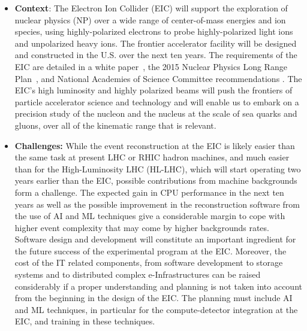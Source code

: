 \begin{itemize}
        \item \textbf{Context}:
        The Electron Ion Collider (EIC) will support the exploration of nuclear physics (NP) over a wide range of center-of-mass energies and ion species, using highly-polarized electrons to probe highly-polarized light ions and unpolarized heavy ions. The frontier accelerator facility will be designed and constructed in the U.S. over the next ten years. The requirements of the EIC are detailed in a white paper~\cite{Accardi:2012qut}, the 2015 Nuclear Physics Long Range Plan~\cite{Geesaman:2015fha}, and National Academies of Science Committee recommendations \cite{NAS:2018eic}. The EIC’s high luminosity and highly polarized beams will push the frontiers of particle accelerator science and technology and will enable us to embark on a precision study of the nucleon and the nucleus at the scale of sea quarks and gluons, over all of the kinematic range that is relevant. 

        \item \textbf{Challenges:}
        While the event reconstruction at the EIC is likely easier than the same task at present LHC or RHIC hadron machines, and much easier than for the High-Luminosity LHC (HL-LHC), which will start operating two years earlier than the EIC, possible contributions from machine backgrounds form a challenge. The expected gain in CPU performance in the next ten years as well as the possible improvement in the reconstruction software from the use of AI and ML techniques give a considerable margin to cope with higher event complexity that may come by higher backgrounds rates. Software design and development will constitute an important ingredient for the future success of the experimental program at the EIC. Moreover, the cost of the IT related components, from software development to storage systems and to distributed complex e-Infrastructures can be raised considerably if a proper understanding and planning is not taken into account from the beginning in the design of the EIC. The planning must include AI and ML techniques, in particular for the compute-detector integration at the EIC, and training in these techniques. 
        

\end{itemize}
